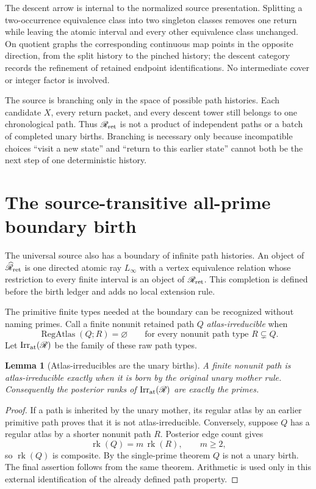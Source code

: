 \documentclass[11pt]{article}
\newtheorem{lemma}[theorem]{Lemma}
\newcommand{\rk}{\operatorname{rk}}
\newcommand{\RegAtlas}{\operatorname{RegAtlas}}
\begin{document}
The descent arrow is internal to the normalized source presentation.  Splitting
a two-occurrence equivalence class into two singleton classes removes one
return while leaving the atomic interval and every other equivalence class
unchanged.  On quotient graphs the corresponding continuous map points in the
opposite direction, from the split history to the pinched history; the descent
category records the refinement of retained endpoint identifications.  No
intermediate cover or integer factor is involved.

The source is branching only in the space of possible path histories.  Each
candidate \(X\), every return packet, and every descent tower still belongs to
one chronological path.  Thus \(\mathscr R_{\rm ret}\) is not a product of
independent paths or a batch of completed unary births.  Branching is necessary
only because incompatible choices ``visit a new state'' and ``return to this
earlier state'' cannot both be the next step of one deterministic history.


\section{The source-transitive all-prime boundary birth}

The universal source also has a boundary of infinite path histories.  An object
of \(\widehat{\mathscr R}_{\rm ret}\) is one directed atomic ray \(L_\infty\)
with a vertex equivalence relation whose restriction to every finite interval
is an object of \(\mathscr R_{\rm ret}\).  This completion is defined before
the birth ledger and adds no local extension rule.

The primitive finite types needed at the boundary can be recognized without
naming primes.  Call a finite nonunit retained path \(Q\)
\emph{atlas-irreducible} when
\[
\RegAtlas(Q;R)=\varnothing
\qquad
\text{for every nonunit path type }R\subsetneq Q.
\]
Let \(\operatorname{Irr}_{\rm at}(\mathscr R)\) be the family of these raw path
types.

\begin{lemma}[Atlas-irreducibles are the unary births]
\label{lem:atlas-irreducible}
A finite nonunit path is atlas-irreducible exactly when it is born by the
original unary mother rule.  Consequently the posterior ranks of
\(\operatorname{Irr}_{\rm at}(\mathscr R)\) are exactly the primes.
\end{lemma}

\begin{proof}
If a path is inherited by the unary mother, its regular atlas by an earlier
primitive path proves that it is not atlas-irreducible.  Conversely, suppose
\(Q\) has a regular atlas by a shorter nonunit path \(R\).  Posterior edge count
gives
\[
\rk(Q)=m\,\rk(R),
\qquad m\ge2,
\]
so \(\rk(Q)\) is composite.  By the single-prime theorem \(Q\) is not a unary
birth.  The final assertion follows from the same theorem.  Arithmetic is used
only in this external identification of the already defined path property.
\end{proof}
\end{document}

